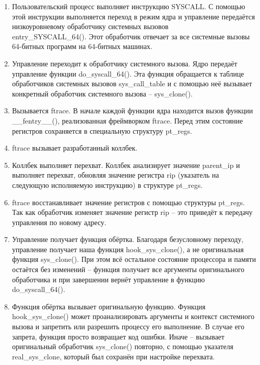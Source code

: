 \begin{enumerate}
	\item Пользовательский процесс выполняет инструкцию SYSCALL. С помощью этой инструкции выполняется переход в режим ядра и управление передаётся низкоуровневому обработчику системных вызовов\\ entry\_SYSCALL\_64(). Этот обработчик отвечает за все системные вызовы 64-битных программ на 64-битных машинах.
	
	\item Управление переходит к обработчику системного вызова. Ядро передаёт управление функции do\_syscall\_64(). Эта функция обращается к таблице обработчиков системных вызовов sys\_call\_table и с помощью неё вызывает конкретный обработчик системного вызова -- sys\_clone().
	
	\item Вызывается ftrace. В начале каждой функции ядра находится вызов функции \_\_fentry\_\_(), реализованная фреймворком ftrace. Перед этим состояние регистров сохраняется в специальную структуру pt\_regs.
	
	\item ftrace вызывает разработанный коллбек.
	
	\item Коллбек выполняет перехват. Коллбек анализирует значение  parent\_ip и выполняет перехват, обновляя значение регистра rip (указатель на следующую исполняемую инструкцию) в структуре pt\_regs.
	
	\item ftrace восстанавливает значение регистров с помощью структуры pt\_regs. Так как обработчик изменяет значение регистр rip -- это приведёт к передачу управления по новому адресу.
	
	\item Управление получает функция обёртка. Благодаря безусловному переходу, управление получает наша функция hook\_sys\_clone(), а не оригинальная функция sys\_clone(). При этом всё остальное состояние процессора и памяти остаётся без изменений -- функция получает все аргументы оригинального обработчика и при завершении вернёт управление в функцию do\_syscall\_64().
	
	\item Функция обёртка вызывает оригинальную функцию. Функция\\ hook\_sys\_clone() может проанализировать аргументы и контекст системного вызова и запретить или разрешить процессу его выполнение. В случае его запрета, функция просто возвращает код ошибки. Иначе -- вызывает оригинальный обработчик sys\_clone() повторно, с помощью указателя real\_sys\_clone, который был сохранён при настройке перехвата.
	

\end{enumerate}
